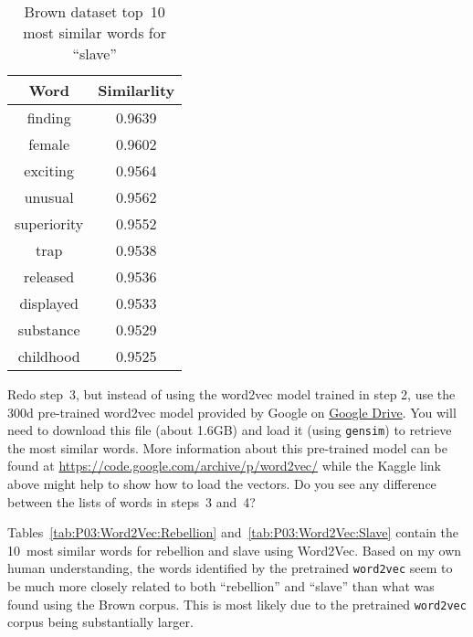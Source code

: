\begin{table}[h]
  \centering
  \caption{Brown dataset top~10 most similar words for ``slave''}\label{tab:P03:Brown:Slave}
  \begin{tabular}{|c|c|}
    \hline
    \textbf{Word} & \textbf{Similarlity} \\\hline\hline
    finding       & 0.9639 \\\hline
    female        & 0.9602 \\\hline
    exciting      & 0.9564 \\\hline
    unusual       & 0.9562 \\\hline
    superiority   & 0.9552 \\\hline
    trap          & 0.9538 \\\hline
    released      & 0.9536 \\\hline
    displayed     & 0.9533 \\\hline
    substance     & 0.9529 \\\hline
    childhood     & 0.9525 \\\hline
  \end{tabular}
\end{table}

\begin{subproblem}
  Redo step~3, but instead of using the word2vec model trained in step 2, use the 300d pre-trained word2vec model provided by Google on \href{https://drive.google.com/file/d/0B7XkCwpI5KDYNlNUTTlSS21pQmM/edit}{Google Drive}. You will need to download this file (about 1.6GB) and load it (using \texttt{gensim}) to retrieve the most similar words. More information about this pre-trained model can be found at \url{https://code.google.com/archive/p/word2vec/} while the Kaggle link above might help to show how to load the vectors. Do you see any difference between the lists of words in steps~3 and~4?
\end{subproblem}

Tables~\ref{tab:P03:Word2Vec:Rebellion} and~\ref{tab:P03:Word2Vec:Slave} contain the 10~most similar words for rebellion and slave using Word2Vec.  Based on my own human understanding, the words identified by the pretrained \texttt{word2vec} seem to be much more closely related to both ``rebellion'' and ``slave'' than what was found using the Brown corpus.  This is most likely due to the pretrained \texttt{word2vec} corpus being substantially larger.

